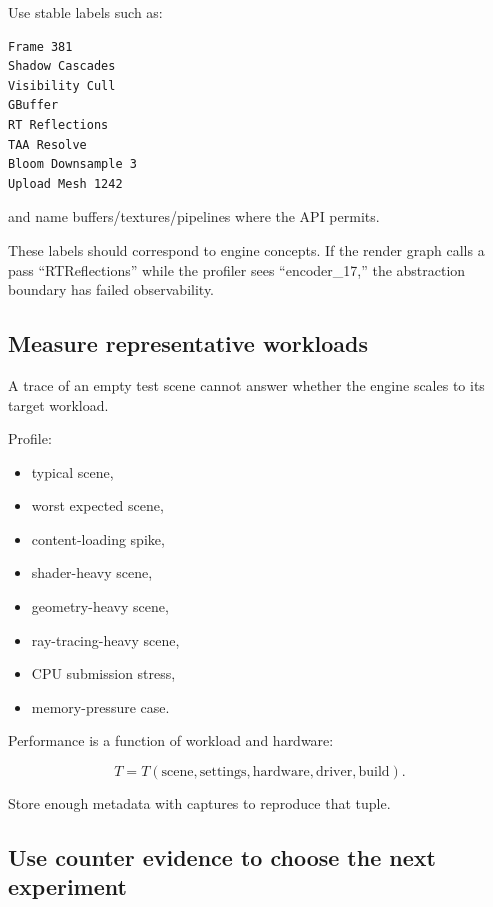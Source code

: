 Use stable labels such as:

\begin{verbatim}
Frame 381
Shadow Cascades
Visibility Cull
GBuffer
RT Reflections
TAA Resolve
Bloom Downsample 3
Upload Mesh 1242
\end{verbatim}

and name buffers/textures/pipelines where the API permits.

These labels should correspond to engine concepts. If the render graph calls a pass ``RTReflections'' while the profiler sees ``encoder\_17,'' the abstraction boundary has failed observability.

\subsection{Measure representative workloads}\label{05-engine-i-ch008-measure-representative-workloads}

\hypertarget{05-engine-i-ch008-measure-representative-workloads}{}

A trace of an empty test scene cannot answer whether the engine scales to its target workload.

Profile:

\begin{itemize}
\tightlist
\item
  typical scene,
\item
  worst expected scene,
\item
  content-loading spike,
\item
  shader-heavy scene,
\item
  geometry-heavy scene,
\item
  ray-tracing-heavy scene,
\item
  CPU submission stress,
\item
  memory-pressure case.
\end{itemize}

Performance is a function of workload and hardware:

\[
T = T(\text{scene},\text{settings},\text{hardware},\text{driver},\text{build}).
\]

Store enough metadata with captures to reproduce that tuple.

\subsection{Use counter evidence to choose the next experiment}\label{05-engine-i-ch008-use-counter-evidence-to-choose-the-next-experiment}

